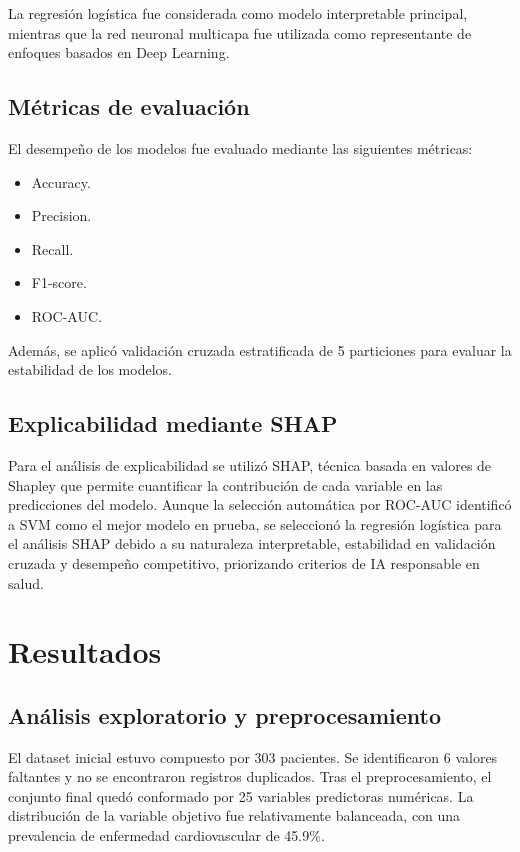 \documentclass[conference]{IEEEtran}
\begin{document}
La regresión logística fue considerada como modelo interpretable principal, mientras que la red neuronal multicapa fue utilizada como representante de enfoques basados en Deep Learning.

\subsection{Métricas de evaluación}

El desempeño de los modelos fue evaluado mediante las siguientes métricas:

\begin{itemize}
    \item Accuracy.
    \item Precision.
    \item Recall.
    \item F1-score.
    \item ROC-AUC.
\end{itemize}

Además, se aplicó validación cruzada estratificada de 5 particiones para evaluar la estabilidad de los modelos.

\subsection{Explicabilidad mediante SHAP}

Para el análisis de explicabilidad se utilizó SHAP, técnica basada en valores de Shapley que permite cuantificar la contribución de cada variable en las predicciones del modelo. Aunque la selección automática por ROC-AUC identificó a SVM como el mejor modelo en prueba, se seleccionó la regresión logística para el análisis SHAP debido a su naturaleza interpretable, estabilidad en validación cruzada y desempeño competitivo, priorizando criterios de IA responsable en salud.

\section{Resultados}

\subsection{Análisis exploratorio y preprocesamiento}

El dataset inicial estuvo compuesto por 303 pacientes. Se identificaron 6 valores faltantes y no se encontraron registros duplicados. Tras el preprocesamiento, el conjunto final quedó conformado por 25 variables predictoras numéricas. La distribución de la variable objetivo fue relativamente balanceada, con una prevalencia de enfermedad cardiovascular de 45.9\%.
\end{document}
